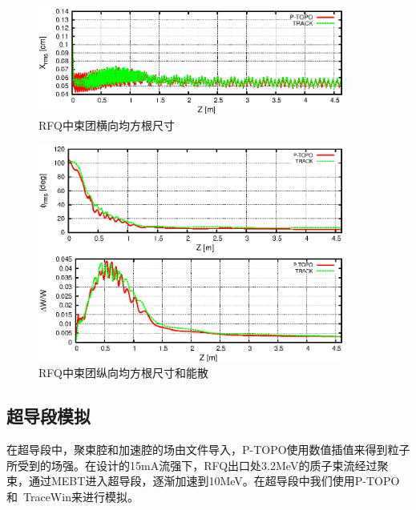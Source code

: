 \begin{figure}[!htb]
    \centering
    \includegraphics[width=0.9\textwidth]{Img/ADS_RFQ_size1.eps}
    \caption{RFQ中束团横向均方根尺寸}
    \label{fig:ADS_RFQ_size1}
\end{figure}

\begin{figure}[!htb]
    \centering
    \includegraphics[width=0.9\textwidth]{Img/ADS_RFQ_size2.eps}
    \caption{RFQ中束团纵向均方根尺寸和能散}
    \label{fig:ADS_RFQ_size2}
\end{figure}

\subsection{超导段模拟}
在超导段中，聚束腔和加速腔的场由文件导入，P-TOPO使用数值插值来得到粒子所受到的场强。在设计的15mA流强下，RFQ出口处3.2MeV的质子束流经过聚束，通过MEBT进入超导段，逐渐加速到10MeV。在超导段中我们使用P-TOPO和~TraceWin来进行模拟。

